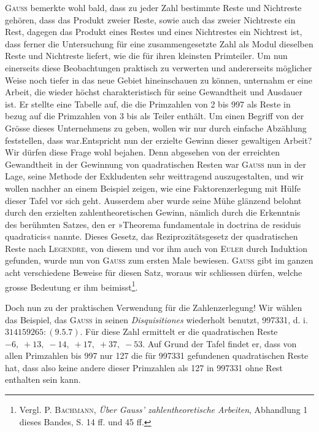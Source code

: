 \textsc{Gauss} bemerkte wohl bald, dass zu jeder Zahl bestimmte Reste und Nichtreste gehören, dass das Produkt zweier Reste, sowie auch das zweier Nichtreste ein Rest, dagegen das Produkt eines Restes und eines Nichtrestes ein
Nichtrest ist, dass ferner die Untersuchung für eine zusammengesetzte Zahl
als Modul dieselben Reste und Nichtreste liefert, wie die für ihren kleinsten
Primteiler. Um nun einerseits diese Beobachtungen praktisch zu verwerten
und andererseits möglicher Weise noch tiefer in das neue Gebiet hineinschauen
zu können, unternahm er eine Arbeit, die wieder höchst charakteristisch für
seine Gewandtheit und Ausdauer ist. Er stellte eine Tabelle auf, die die
Primzahlen von 2 bis 997 als Reste in bezug auf die Primzahlen von 3 bis
\clearpage{}
\setcounter{footnote}{0}
 als Teiler enthält. Um einen Begriff von der Grösse dieses Unternehmens
zu geben, wollen wir nur durch einfache Abzählung feststellen, dass  war.\linebreak Entspricht nun der erzielte Gewinn dieser gewaltigen Arbeit? Wir dürfen diese Frage wohl bejahen. Denn abgesehen von der erreichten Gewandtheit in der Gewinnung von quadratischen Resten war \textsc{Gauss}
nun in der Lage, seine Methode der Exkludenten sehr weittragend auszugestalten, und wir wollen nachher an einem Beispiel zeigen, wie eine Faktorenzerlegung mit Hülfe dieser Tafel vor sich geht. Ausserdem aber wurde seine
Mühe glänzend belohnt durch den erzielten zahlentheoretischen Gewinn, nämlich durch die Erkenntnis des berühmten Satzes, den er »Theorema fundamentale in doctrina de residuis quadraticis« nannte. Dieses Gesetz, das Reziprozitätsgesetz der quadratischen Reste nach \textsc{Legendre}, von diesem und vor
ihm auch von \textsc{Euler} durch Induktion gefunden, wurde nun von \textsc{Gauss} zum
ersten Male bewiesen. \textsc{Gauss} gibt im ganzen acht verschiedene Beweise für
diesen Satz, woraus wir schliessen dürfen, welche grosse Bedeutung er ihm
beimisst\footnote{Vergl. P. \textsc{Bachmann}, \textit{Über Gauss’ zahlentheoretische Arbeiten}, Abhandlung 1 dieses Bandes, S. 14 ff. und 45 ff.}.

Doch nun zu der praktischen Verwendung für die Zahlenzerlegung! Wir
wählen das Beispiel, das \textsc{Gauss} in seinen \textit{Disquisitiones} wiederholt benutzt,
997331, d. i. $314159265:(9\mathord{.}5\mathord{.}7)$. Für diese Zahl ermittelt er die quadratischen Reste $-6,\;+13,\;-14,\;+17,\;+37,\;-53$. Auf Grund der Tafel
findet er, dass von allen Primzahlen bis 997 nur 127 die für 997331 gefundenen quadratischen Reste hat, dass also keine andere dieser Primzahlen
als 127 in 997331 ohne Rest enthalten sein kann.

